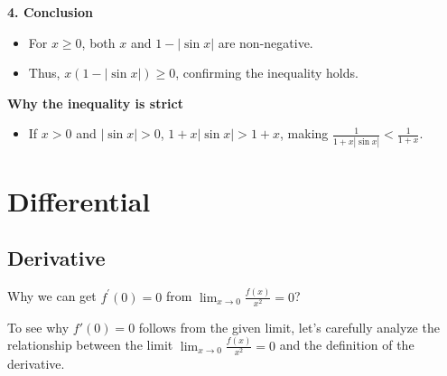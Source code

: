 \documentclass[a4paper,12pt]{book}
\begin{document}
\textbf{4. Conclusion}

\begin{itemize}
\item 
For \( x \geq 0 \), both \( x \) and \( 1 - |\sin x| \) are non-negative.

\item 
Thus, \( x(1 - |\sin x|) \geq 0 \), confirming the inequality holds.

\end{itemize}

\textbf{Why the inequality is strict}

\begin{itemize}
\item 
If \( x > 0 \) and \( |\sin x| > 0 \), \( 1 + x|\sin x| > 1 + x \), making \( \frac{1}{1 + x|\sin x|} < \frac{1}{1 + x} \).

\end{itemize}


\chapter{Differential}

\section{Derivative}

\begin{bluebox}
Why we can get \(f^{\prime}(0)=0\) from \(\lim_{x\to 0}\frac{f(x)}{x^2}=0\)?
\end{bluebox}

To see why \( f'(0) = 0 \) follows from the given limit, let's carefully analyze the relationship between the limit \(\lim_{x \to 0} \frac{f(x)}{x^2} = 0\) and the definition of the derivative.
\end{document}
